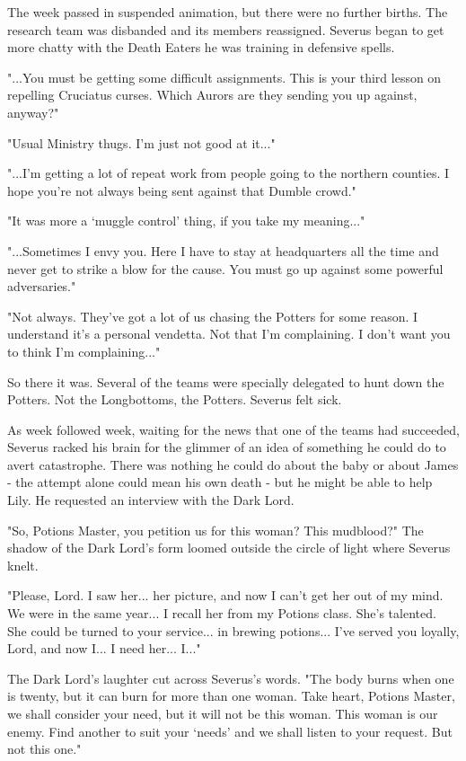 The week passed in suspended animation, but there were no further births. The research team was disbanded and its members reassigned. Severus began to get more chatty with the Death Eaters he was training in defensive spells.

"...You must be getting some difficult assignments. This is your third lesson on repelling Cruciatus curses. Which Aurors are they sending you up against, anyway?"

"Usual Ministry thugs. I'm just not good at it..."

"...I'm getting a lot of repeat work from people going to the northern counties. I hope you're not always being sent against that Dumble crowd."

"It was more a `muggle control' thing, if you take my meaning..."

"...Sometimes I envy you. Here I have to stay at headquarters all the time and never get to strike a blow for the cause. You must go up against some powerful adversaries."

"Not always. They've got a lot of us chasing the Potters for some reason. I understand it's a personal vendetta. Not that I'm complaining. I don't want you to think I'm complaining..."

So there it was. Several of the teams were specially delegated to hunt down the Potters. Not the Longbottoms, the Potters. Severus felt sick.

As week followed week, waiting for the news that one of the teams had succeeded, Severus racked his brain for the glimmer of an idea of something he could do to avert catastrophe. There was nothing he could do about the baby or about James - the attempt alone could mean his own death - but he might be able to help Lily. He requested an interview with the Dark Lord.

"So, Potions Master, you petition us for this woman? This mudblood?" The shadow of the Dark Lord's form loomed outside the circle of light where Severus knelt.

"Please, Lord. I saw her... her picture, and now I can't get her out of my mind. We were in the same year... I recall her from my Potions class. She's talented. She could be turned to your service... in brewing potions... I've served you loyally, Lord, and now I... I need her... I..."

The Dark Lord's laughter cut across Severus's words. "The body burns when one is twenty, but it can burn for more than one woman. Take heart, Potions Master, we shall consider your need, but it will not be this woman. This woman is our enemy. Find another to suit your `needs' and we shall listen to your request. But not this one."

